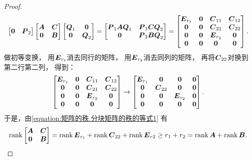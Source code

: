 \begin{example}
\begin{proof}
\begin{equation*}
\begin{bmatrix}
		\boldsymbol0 & \boldsymbol{P}_2
	\end{bmatrix}
	\begin{bmatrix}
		\boldsymbol{A} & \boldsymbol{C} \\
		\boldsymbol0 & \boldsymbol{B}
	\end{bmatrix}
	\begin{bmatrix}
		\boldsymbol{Q}_1 & \boldsymbol0 \\
		\boldsymbol0 & \boldsymbol{Q}_2
	\end{bmatrix}
	= \begin{bmatrix}
		\boldsymbol{P}_1\boldsymbol{A}\boldsymbol{Q}_1 & \boldsymbol{P}_1\boldsymbol{C}\boldsymbol{Q}_2 \\
		\boldsymbol0 & \boldsymbol{P}_2\boldsymbol{B}\boldsymbol{Q}_2
	\end{bmatrix}
	= \begin{bmatrix}
		\boldsymbol{E}_{r_1} & \boldsymbol0 & \boldsymbol{C}_{11} & \boldsymbol{C}_{12} \\
		\boldsymbol0 & \boldsymbol0 & \boldsymbol{C}_{21} & \boldsymbol{C}_{22} \\
		\boldsymbol0 & \boldsymbol0 & \boldsymbol{E}_{r_2} & \boldsymbol0 \\
		\boldsymbol0 & \boldsymbol0 & \boldsymbol0 & \boldsymbol0
	\end{bmatrix}.
\end{equation*}
做初等变换，
用\(\boldsymbol{E}_{r_1}\)消去同行的矩阵，
用\(\boldsymbol{E}_{r_2}\)消去同列的矩阵，
再将\(\boldsymbol{C}_{22}\)对换到第二行第二列，
得到：\begin{equation*}
	\begin{bmatrix}
		\boldsymbol{E}_{r_1} & \boldsymbol0 & \boldsymbol{C}_{11} & \boldsymbol{C}_{12} \\
		\boldsymbol0 & \boldsymbol0 & \boldsymbol{C}_{21} & \boldsymbol{C}_{22} \\
		\boldsymbol0 & \boldsymbol0 & \boldsymbol{E}_{r_2} & \boldsymbol0 \\
		\boldsymbol0 & \boldsymbol0 & \boldsymbol0 & \boldsymbol0
	\end{bmatrix}
	\to \begin{bmatrix}
		\boldsymbol{E}_{r_1} & \boldsymbol0 & \boldsymbol0 & \boldsymbol0 \\
		\boldsymbol0 & \boldsymbol{C}_{22} & \boldsymbol0 & \boldsymbol0 \\
		\boldsymbol0 & \boldsymbol0 & \boldsymbol{E}_{r_2} & \boldsymbol0 \\
		\boldsymbol0 & \boldsymbol0 & \boldsymbol0 & \boldsymbol0
	\end{bmatrix}.
\end{equation*}
于是，由\cref{equation:矩阵的秩.分块矩阵的秩的等式1} 有\begin{equation*}
	\rank\begin{bmatrix}
		\boldsymbol{A} & \boldsymbol{C} \\
		\boldsymbol0 & \boldsymbol{B}
	\end{bmatrix}
	= \rank\boldsymbol{E}_{r_1} + \rank\boldsymbol{C}_{22} + \rank\boldsymbol{E}_{r2}
	\geq r_1 + r_2
	= \rank\boldsymbol{A} + \rank\boldsymbol{B}.
\end{equation*}


\end{proof}
\end{example}

